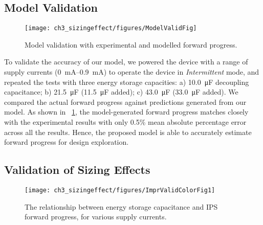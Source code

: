 
\subsection{Model Validation} 

\begin{figure}
	\centering
	\texttt{[image: ch3\_sizingeffect/figures/ModelValidFig]}
	\caption{Model validation with experimental and modelled forward progress. }
	\label{fig:modelvalid}
\end{figure}

To validate the accuracy of our model, we powered the device with a range of supply currents (\SIrange{0}{0.9}{\milli\ampere}) to operate the device in \textit{Intermittent} mode, and repeated the tests with three energy storage capacities: a) \SI{10.0}{\micro\farad} decoupling capacitance; b) \SI{21.5}{\micro\farad} (\SI{11.5}{\micro\farad} added); c) \SI{43.0}{\micro\farad} (\SI{33.0}{\micro\farad} added).
We compared the actual forward progress against predictions generated from our model. 
As shown in \figurename{~\ref{fig:modelvalid}}, the model-generated forward progress matches closely with the experimental results with only 0.5\% mean absolute percentage error across all the results. 
Hence, the proposed model is able to accurately estimate forward progress for design exploration. 

\subsection{Validation of Sizing Effects}

\begin{figure}
    \centering
    \texttt{[image: ch3\_sizingeffect/figures/ImprValidColorFig1]}
    \caption{The relationship between energy storage capacitance and IPS forward progress, for various supply currents. }
    \label{fig:imprvalid1}
\end{figure}

